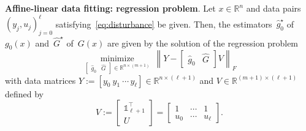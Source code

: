 \documentclass[a4paper, reqno]{amsart}
\newcommand{\dd}{\ell}
\newcommand{\one}{\mathds{1}}
\begin{document}
\begin{supplementbox}
    \textbf{Affine-linear data fitting: regression problem}. Let $x \in \mathbb{R}^n$ and data pairs $(y_j,u_j)_{j=0}^{\dd}$ satisfying~\eqref{eq:disturbance} be given. 
    Then, the estimators~$\hat{g}_0^\star$ of $g_0(x)$ and~$\widehat{G}^\star$ of~$G(x)$ are given by the solution of the regression problem
    \begin{equation}\label{eq:lsq}
        \operatorname*{minimize}_{[\begin{smallmatrix}
            \hat{g}_0 & \widehat{G}
        \end{smallmatrix}] \in \mathbb R^{n\times (m+1)}}\ \left\lVert Y - \begin{bmatrix}
            \hat{g}_0 & \widehat{G}
        \end{bmatrix} V\right\rVert_F
    \end{equation}
    with data matrices $Y := [y_0\ y_1\ \cdots\, y_{\dd}] \in \mathbb{R}^{n \times (\dd+1)}$ and $V \in \mathbb{R}^{(m+1)\times (\dd+1)}$ defined by
    \begin{equation}\label{eq:V}
        V := \begin{bmatrix}
            \one_{\dd+1}^\top \\ U
        \end{bmatrix} = \begin{bmatrix}
            1 & \cdots & 1\\
            u_0 & \cdots & u_{\dd} 
    \end{bmatrix}.
    \end{equation}
\end{supplementbox}
\end{document}
